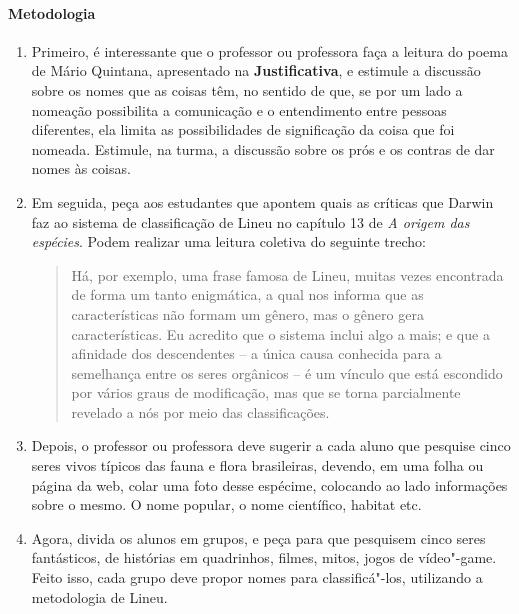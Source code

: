 \documentclass[11pt]{extarticle}
\begin{document}
\paragraph{Metodologia}

\begin{enumerate}

	\item
	Primeiro, é interessante que o professor ou professora faça a leitura do poema
	de Mário Quintana, apresentado na \textbf{Justificativa}, e estimule a discussão
	sobre os nomes que as coisas têm, no sentido de que, se por um lado
	a nomeação possibilita a comunicação e o entendimento entre pessoas
	diferentes, ela limita as possibilidades de significação da coisa que foi nomeada.
	Estimule, na turma, a discussão sobre os prós e os contras de dar nomes
	às coisas.

	\item
	Em seguida, peça aos estudantes que apontem quais as críticas que Darwin faz ao sistema
	de classificação de Lineu no capítulo 13 de \emph{A origem das espécies}.
	Podem realizar uma leitura coletiva do seguinte trecho:

	\begin{quote}
	 Há, por exemplo, uma frase famosa de Lineu, muitas vezes encontrada de forma um tanto enigmática, a qual nos informa que as características não formam um gênero, mas o gênero gera características. Eu acredito que o sistema inclui algo a mais; e que a afinidade dos descendentes -- a única causa conhecida para a semelhança entre os seres orgânicos -- é um vínculo que está escondido por vários graus de modificação, mas que se torna parcialmente revelado a nós por meio das classificações.
	\end{quote}

	\item
	Depois, o professor ou professora deve sugerir a cada aluno que pesquise cinco 
	seres vivos típicos das fauna e flora brasileiras, devendo, em uma folha ou 
	página da web, colar uma foto desse espécime, colocando ao lado informações sobre o 
	mesmo. O nome popular, o nome científico, habitat etc.

	\item
	Agora, divida os alunos em grupos, e peça para que pesquisem cinco
	seres fantásticos, de histórias em quadrinhos, filmes, mitos, jogos de
	vídeo"-game. Feito isso, cada grupo deve propor nomes para classificá"-los,
	utilizando a metodologia de Lineu.

\end{enumerate}
\end{document}
